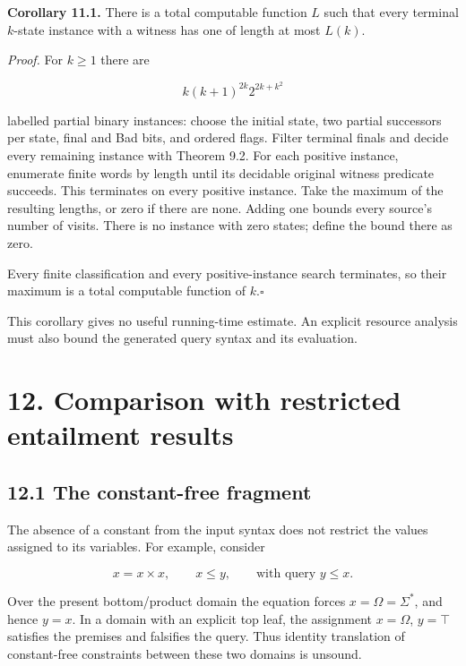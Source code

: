\documentclass[
  11pt,
  a4paper,
]{article}
\newcounter{none} %
\begin{document}
\textbf{Corollary 11.1.} There is a total computable function \(L\) such
that every terminal \(k\)-state instance with a witness has one of
length at most \(L(k)\).

\emph{Proof.} For \(k\ge1\) there are

\[k(k+1)^{2k}2^{2k+k^2}\]

labelled partial binary instances: choose the initial state, two partial
successors per state, final and Bad bits, and ordered flags. Filter
terminal finals and decide every remaining instance with Theorem 9.2.
For each positive instance, enumerate finite words by length until its
decidable original witness predicate succeeds. This terminates on every
positive instance. Take the maximum of the resulting lengths, or zero if
there are none. Adding one bounds every source's number of visits. There
is no instance with zero states; define the bound there as zero.

Every finite classification and every positive-instance search
terminates, so their maximum is a total computable function of
\(k\).\nobreak\hspace{.5em}\(\square\)

This corollary gives no useful running-time estimate. An explicit
resource analysis must also bound the generated query syntax and its
evaluation.


\section{12. Comparison with restricted entailment
results}\label{comparison-with-restricted-entailment-results}

\subsection{12.1 The constant-free
fragment}\label{the-constant-free-fragment}

The absence of a constant from the input syntax does not restrict the
values assigned to its variables. For example, consider

\[x=x\times x,\qquad x\le y,\qquad\text{with query }y\le x.\]

Over the present bottom/product domain the equation forces
\(x=\Omega=\Sigma^*\), and hence \(y=x\). In a domain with an explicit
top leaf, the assignment \(x=\Omega\), \(y=\top\) satisfies the premises
and falsifies the query. Thus identity translation of constant-free
constraints between these two domains is unsound.
\end{document}
